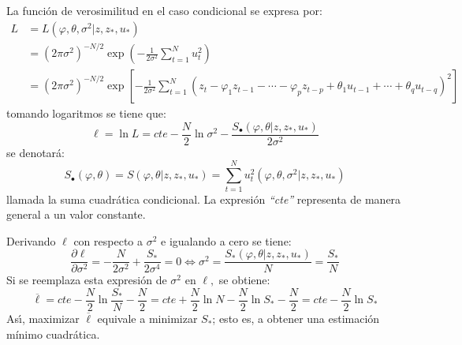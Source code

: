 La funci\'{o}n de verosimilitud en el caso condicional se expresa por:
\begin{align*}
 L
	&=L\left(\varphi ,\theta ,\sigma^{2}|z,z_{\ast } ,u_{\ast } \right)\\
	&=\left( 2\pi \sigma^{2} \right)^{-N/2}\exp \left(-\frac{1} {2 \sigma^{2}} \sum_{t=1}^N u_{t}^{2} \right) \\
	&=\left( {2\pi \sigma^{2}} \right)^{-N/2}\exp \left[ {-\frac{1}{2\sigma^{2}}\sum_{t=1}^N {\left( {z_{t} -\varphi_{1}z_{t-1} -\cdots -\varphi_{p} z_{t-p} +\theta_{1} u_{t-1} +\cdots +\theta_{q} u_{t-q} } \right)^{2}} } \right]
\end{align*}
tomando logaritmos se tiene que:
\[
\ell =\ln L=cte-\frac{N}{2}\ln\sigma^{2}-\frac{S_{\bullet } \left( {\varphi 
,\theta | {z,z_{\ast } ,u_{\ast } } } \right)}{2\sigma 
^{2}}
\]
se denotar\'{a}: 
\[
S_{\bullet } \left( {\varphi ,\theta } \right)=S\left( {\varphi 
,\theta | {z,z_{\ast } ,u_{\ast } }} \right)=\sum_{t=1}^N {u_{t}^{2} \left( {\varphi ,\theta ,\sigma ^{2}| {z,z_{\ast } ,u_{\ast } } } \right)} 
\]
llamada la suma cuadr\'{a}tica condicional. La expresi\'{o}n \emph{``cte''} representa de manera general a un valor constante.

Derivando $\ell $ con respecto a $\sigma^{2}$ e igualando a cero se tiene:
\[
\frac{\partial \ell }{\partial \sigma^{2}}=-\frac{N}{2\sigma 
^{2}}+\frac{S_{\ast } }{2\sigma^{4}}=0\Longleftrightarrow \sigma 
^{2}=\frac{S_{\ast } \left( {\varphi ,\theta \left| {z,z_{\ast } 
,u_{\ast } } \right.} \right)}{N}=\frac{S_{\ast } }{N}
\]
Si se reemplaza esta expresi\'{o}n de $\sigma^{2}$ en $\ell ,$ se obtiene:
\[
\overline \ell =cte-\frac{N}{2}\ln\frac{S_{\ast } 
}{N}-\frac{N}{2}=cte+\frac{N}{2}\ln N-\frac{N}{2}\ln S_{\ast } 
-\frac{N}{2}=cte-\frac{N}{2}\ln S_{\ast } 
\]
As\'{\i}, maximizar $\overline \ell $ equivale a minimizar $S_{\ast } $; 
esto es, a obtener una estimaci\'{o}n m\'{i}nimo cuadr\'{a}tica.


